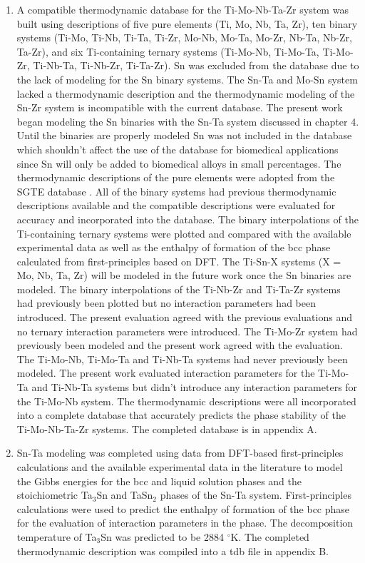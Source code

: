 \begin{enumerate}
	\item A compatible thermodynamic database for the Ti-Mo-Nb-Ta-Zr system was built using descriptions of five pure elements (Ti, Mo, Nb, Ta, Zr), ten binary systems (Ti-Mo, Ti-Nb, Ti-Ta, Ti-Zr, Mo-Nb, Mo-Ta, Mo-Zr, Nb-Ta, Nb-Zr, Ta-Zr), and six Ti-containing ternary systems (Ti-Mo-Nb, Ti-Mo-Ta, Ti-Mo-Zr, Ti-Nb-Ta, Ti-Nb-Zr, Ti-Ta-Zr). Sn was excluded from the database due to the lack of modeling for the Sn binary systems. The Sn-Ta and Mo-Sn system lacked a thermodynamic description and the thermodynamic modeling of the Sn-Zr system is incompatible with the current database. The present work began modeling the Sn binaries with the Sn-Ta system discussed in chapter 4. Until the binaries are properly modeled Sn was not included in the database which shouldn't affect the use of the database for biomedical applications since Sn will only be added to biomedical alloys in small percentages. The thermodynamic descriptions of the pure elements were adopted from the SGTE database \cite{Dinsdale1991}. All of the binary systems had previous thermodynamic descriptions available and the compatible descriptions were evaluated for accuracy and incorporated into the database. The binary interpolations of the Ti-containing ternary systems were plotted and compared with the available experimental data as well as the enthalpy of formation of the bcc phase calculated from first-principles based on DFT. The Ti-Sn-X systems (X = Mo, Nb, Ta, Zr) will be modeled in the future work once the Sn binaries are modeled. The binary interpolations of the Ti-Nb-Zr and Ti-Ta-Zr systems had previously been plotted but no interaction parameters had been introduced. The present evaluation agreed with the previous evaluations and no ternary interaction parameters were introduced. The Ti-Mo-Zr system had previously been modeled and the present work agreed with the evaluation. The Ti-Mo-Nb, Ti-Mo-Ta and Ti-Nb-Ta systems had never previously been modeled. The present work evaluated interaction parameters for the Ti-Mo-Ta and Ti-Nb-Ta systems but didn't introduce any interaction parameters for the Ti-Mo-Nb system. The thermodynamic descriptions were all incorporated into a complete database that accurately predicts the phase stability of the Ti-Mo-Nb-Ta-Zr systems. The completed database is in appendix A.
	\item Sn-Ta modeling was completed using data from DFT-based first-principles calculations and the available experimental data in the literature to model the Gibbs energies for the bcc and liquid solution phases and the stoichiometric Ta$_3$Sn and TaSn$_2$ phases of the Sn-Ta system. First-principles calculations were used to predict the enthalpy of formation of the bcc phase for the evaluation of interaction parameters in the phase. The decomposition temperature of Ta$_3$Sn was predicted to be 2884 $^\circ$K. The completed thermodynamic description was compiled into a tdb file in appendix B.

\end{enumerate}
